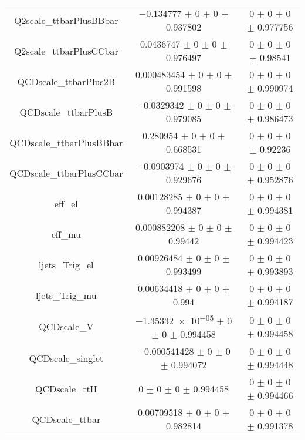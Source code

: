 \begin{table}
\begin{tabular}{ccc}
Q2scale\_ttbarPlusBBbar & \num{-0.134777} $\pm$ \num{0} $\pm$ \num{0} $\pm$ \num{0.937802} & \num{0} $\pm$ \num{0} $\pm$ \num{0} $\pm$ \num{0.977756}\\
Q2scale\_ttbarPlusCCbar & \num{0.0436747} $\pm$ \num{0} $\pm$ \num{0} $\pm$ \num{0.976497} & \num{0} $\pm$ \num{0} $\pm$ \num{0} $\pm$ \num{0.98541}\\
QCDscale\_ttbarPlus2B & \num{0.000483454} $\pm$ \num{0} $\pm$ \num{0} $\pm$ \num{0.991598} & \num{0} $\pm$ \num{0} $\pm$ \num{0} $\pm$ \num{0.990974}\\
QCDscale\_ttbarPlusB & \num{-0.0329342} $\pm$ \num{0} $\pm$ \num{0} $\pm$ \num{0.979085} & \num{0} $\pm$ \num{0} $\pm$ \num{0} $\pm$ \num{0.986473}\\
QCDscale\_ttbarPlusBBbar & \num{0.280954} $\pm$ \num{0} $\pm$ \num{0} $\pm$ \num{0.668531} & \num{0} $\pm$ \num{0} $\pm$ \num{0} $\pm$ \num{0.92236}\\
QCDscale\_ttbarPlusCCbar & \num{-0.0903974} $\pm$ \num{0} $\pm$ \num{0} $\pm$ \num{0.929676} & \num{0} $\pm$ \num{0} $\pm$ \num{0} $\pm$ \num{0.952876}\\
eff\_el & \num{0.00128285} $\pm$ \num{0} $\pm$ \num{0} $\pm$ \num{0.994387} & \num{0} $\pm$ \num{0} $\pm$ \num{0} $\pm$ \num{0.994381}\\
eff\_mu & \num{0.000882208} $\pm$ \num{0} $\pm$ \num{0} $\pm$ \num{0.99442} & \num{0} $\pm$ \num{0} $\pm$ \num{0} $\pm$ \num{0.994423}\\
ljets\_Trig\_el & \num{0.00926484} $\pm$ \num{0} $\pm$ \num{0} $\pm$ \num{0.993499} & \num{0} $\pm$ \num{0} $\pm$ \num{0} $\pm$ \num{0.993893}\\
ljets\_Trig\_mu & \num{0.00634418} $\pm$ \num{0} $\pm$ \num{0} $\pm$ \num{0.994} & \num{0} $\pm$ \num{0} $\pm$ \num{0} $\pm$ \num{0.994187}\\
QCDscale\_V & \num{-1.35332e-05} $\pm$ \num{0} $\pm$ \num{0} $\pm$ \num{0.994458} & \num{0} $\pm$ \num{0} $\pm$ \num{0} $\pm$ \num{0.994458}\\
QCDscale\_singlet & \num{-0.000541428} $\pm$ \num{0} $\pm$ \num{0} $\pm$ \num{0.994072} & \num{0} $\pm$ \num{0} $\pm$ \num{0} $\pm$ \num{0.994448}\\
QCDscale\_ttH & \num{0} $\pm$ \num{0} $\pm$ \num{0} $\pm$ \num{0.994458} & \num{0} $\pm$ \num{0} $\pm$ \num{0} $\pm$ \num{0.994466}\\
QCDscale\_ttbar & \num{0.00709518} $\pm$ \num{0} $\pm$ \num{0} $\pm$ \num{0.982814} & \num{0} $\pm$ \num{0} $\pm$ \num{0} $\pm$ \num{0.991378}\\

\end{tabular}
\end{table}
